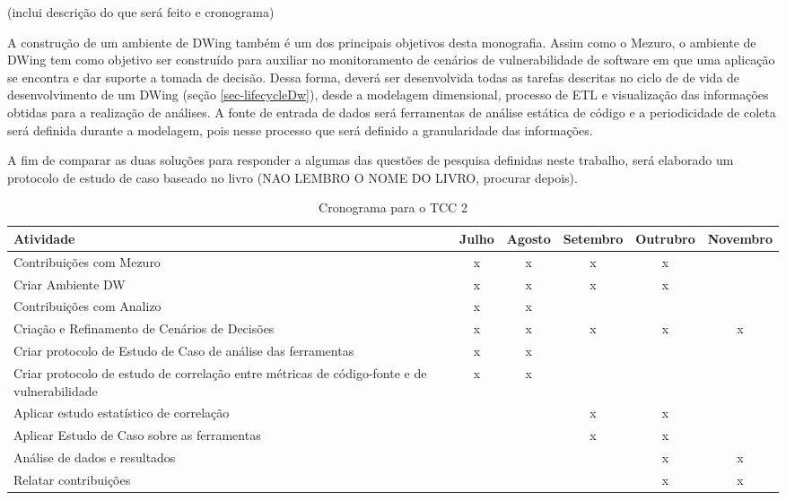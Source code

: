 (inclui descrição do que será feito e cronograma)


%

A construção de um ambiente de DWing também é um dos principais objetivos desta monografia. Assim como o Mezuro, o ambiente de DWing tem como objetivo ser construído para auxiliar no monitoramento de cenários de vulnerabilidade de software em que uma aplicação se encontra e dar suporte a tomada de decisão. Dessa forma, deverá ser desenvolvida todas as tarefas descritas no ciclo de de vida de desenvolvimento de um DWing (seção \ref{sec-lifecycleDw}), desde a modelagem dimensional, processo de ETL e visualização das informações obtidas para a realização de análises. A fonte de entrada de dados será ferramentas de análise estática de código e a periodicidade de coleta será definida durante a modelagem, pois nesse processo que será definido a granularidade das informações.

%

A fim de comparar as duas soluções para responder a algumas das questões de pesquisa definidas neste trabalho, será elaborado um protocolo de estudo de caso baseado no livro (NAO LEMBRO O NOME DO LIVRO, procurar depois). 

	\begin{table}[H]
	\begin{center}
	    \begin{tabular}{ | p{5cm} | c | c |  c |  c |  c |}
	    \hline
	    Atividade & Julho & Agosto & Setembro & Outrubro & Novembro \\ \hline
	    Contribuições com Mezuro & x & x & x & x &  \\ \hline
	    Criar Ambiente DW & x & x & x & x & \\ \hline
	    Contribuições com Analizo & x & x &  &  & \\ \hline
	    Criação e Refinamento de Cenários de Decisões & x & x & x & x & x\\ \hline
	    Criar protocolo de Estudo de Caso de análise das ferramentas & x & x &  &  & \\ \hline
	    Criar protocolo de estudo de correlação entre métricas de código-fonte e de vulnerabilidade & x & x &  &  & \\ \hline
	    Aplicar estudo estatístico de correlação &  &  & x & x & \\ \hline
	    Aplicar Estudo de Caso sobre as ferramentas &  &  & x & x & \\ \hline
	    Análise de dados e resultados &  &  &  & x & x\\ \hline
	    Relatar contribuições &  &  &  & x & x\\ \hline
	    \end{tabular}
	    \caption{Cronograma para o TCC 2}
	    \label{tab:cronograma}
	\end{center}
	\end{table}